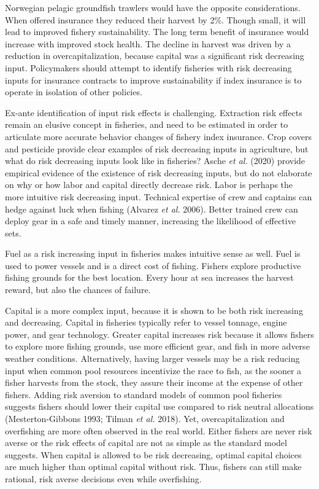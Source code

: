 \documentclass[
  letterpaper,
  DIV=11,
  numbers=noendperiod]{scrartcl}
\theoremstyle{plain}
\theoremstyle{plain}
\theoremstyle{remark}
\begin{document}
Norwegian pelagic groundfish trawlers would have the opposite
considerations. When offered insurance they reduced their harvest by
2\%. Though small, it will lead to improved fishery sustainability. The
long term benefit of insurance would increase with improved stock
health. The decline in harvest was driven by a reduction in
overcapitalization, because capital was a significant risk decreasing
input. Policymakers should attempt to identify fisheries with risk
decreasing inputs for insurance contracts to improve sustainability if
index insurance is to operate in isolation of other policies.

Ex-ante identification of input risk effects is challenging. Extraction
risk effects remain an elusive concept in fisheries, and need to be
estimated in order to articulate more accurate behavior changes of
fishery index insurance. Crop covers and pesticide provide clear
examples of risk decreasing inputs in agriculture, but what do risk
decreasing inputs look like in fisheries? Asche \emph{et al.} (2020)
provide empirical evidence of the existence of risk decreasing inputs,
but do not elaborate on why or how labor and capital directly decrease
risk. Labor is perhaps the more intuitive risk decreasing input.
Technical expertise of crew and captains can hedge against luck when
fishing (Alvarez \emph{et al.} 2006). Better trained crew can deploy
gear in a safe and timely manner, increasing the likelihood of effective
sets.

Fuel as a risk increasing input in fisheries makes intuitive sense as
well. Fuel is used to power vessels and is a direct cost of fishing.
Fishers explore productive fishing grounds for the best location. Every
hour at sea increases the harvest reward, but also the chances of
failure.

Capital is a more complex input, because it is shown to be both risk
increasing and decreasing. Capital in fisheries typically refer to
vessel tonnage, engine power, and gear technology. Greater capital
increases risk because it allows fishers to explore more fishing
grounds, use more efficient gear, and fish in more adverse weather
conditions. Alternatively, having larger vessels may be a risk reducing
input when common pool resources incentivize the race to fish, as the
sooner a fisher harvests from the stock, they assure their income at the
expense of other fishers. Adding risk aversion to standard models of
common pool fisheries suggests fishers should lower their capital use
compared to risk neutral allocations (Mesterton-Gibbons 1993; Tilman
\emph{et al.} 2018). Yet, overcapitalization and overfishing are more
often observed in the real world. Either fishers are never risk averse
or the risk effects of capital are not as simple as the standard model
suggests. When capital is allowed to be risk decreasing, optimal capital
choices are much higher than optimal capital without risk. Thus, fishers
can still make rational, risk averse decisions even while overfishing.
\end{document}
